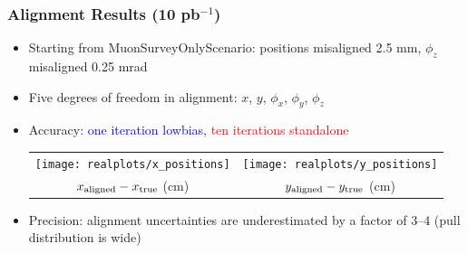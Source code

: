 \documentclass[compress]{beamer}
\begin{document}
\begin{frame}
\frametitle{Alignment Results (10 pb$^{-1}$)}
\begin{itemize}\setlength{\itemsep}{0.25 cm}
\item Starting from MuonSurveyOnlyScenario: positions misaligned 2.5 mm, $\phi_z$ misaligned 0.25 mrad

\item Five degrees of freedom in alignment: $x$, $y$, $\phi_x$, $\phi_y$, $\phi_z$

\item Accuracy: \textcolor{blue}{one iteration lowbias}, \textcolor{red}{ten iterations standalone}
\begin{center}
\begin{tabular}{c c}
\texttt{[image: realplots/x\_positions]} &
\texttt{[image: realplots/y\_positions]} \\
$x_{\mbox{\scriptsize aligned}} - x_{\mbox{\scriptsize true}}$ (cm) &
$y_{\mbox{\scriptsize aligned}} - y_{\mbox{\scriptsize true}}$ (cm)
\end{tabular}
\end{center}

\item Precision: alignment uncertainties are underestimated by a factor of 3--4 (pull distribution is wide)
\end{itemize}
\end{frame}
\end{document}
